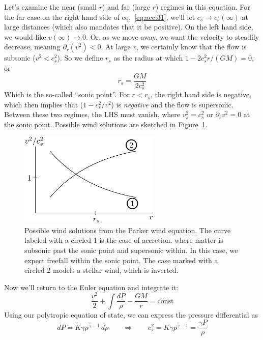 \documentclass[10pt]{article}
\numberwithin{equation}{section}
\newcommand{\n}{\noindent}
\begin{document}
		\n Let's examine the near (small $r$) and far (large $r$) regimes in this equation. For the far case on the right hand side of eq.~\eqref{eq:acc:31}, we'll let $c_s\to c_s(\infty)$ at large distances (which also mandates that it be positive). On the left hand side, we would like $v(\infty)\to 0$. Or, as we move away, we want the velocity to steadily decrease, meaning $\partial_r(v^2)<0$. At large $r$, we certainly know that the flow is subsonic ($v^2<c_s^2$). So we define $r_s$ as the radius at which $1 - 2c_s^2r/(GM)=0$, or
		\begin{equation}
			\label{eq:acc:32} \boxed{r_s = \frac{GM}{2c_s^2}}
		\end{equation}
		Which is the so-called ``sonic point''. For $r<r_s$, the right hand side is negative, which then implies that ($1-c_s^2/v^2$) is \emph{negative} and the flow is supersonic. Between these two regimes, the LHS must vanish, where $v_s^2=c_s^2$ or $\partial_r v^2=0$ at the sonic point. Possible wind solutions are sketched in Figure~\ref{fig:acc:1}.
		\begin{figure}[h]
			\centering
			\includegraphics[width = 0.6\textwidth]{figures/sonic_point.pdf}
			\caption{Possible wind solutions from the Parker wind equation. The curve labeled with a circled 1 is the case of accretion, where matter is subsonic past the sonic point and supersonic within. In this case, we expect freefall within the sonic point. The case marked with a circled 2 models a stellar wind, which is inverted.}
			\label{fig:acc:1}			
		\end{figure}
		Now we'll return to the Euler equation and integrate it:
		\begin{equation}
			\label{eq:acc:33} \frac{v^2}{2}+\int \frac{dP}{\rho} - \frac{GM}{r} = \mathrm{const}
		\end{equation}
		Using our polytropic equation of state, we can express the pressure differential as
		\begin{equation}
			\label{eq:acc:34} dP = K\gamma\rho^{\gamma-1}\,d\rho \qquad \Rightarrow \qquad c_s^2 = K\gamma\rho^{\gamma-1} = \frac{\gamma P}{\rho}
		\end{equation}
\end{document}
